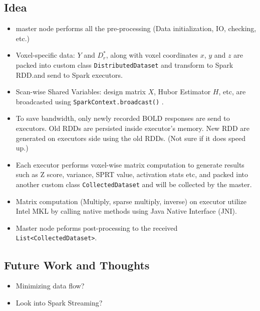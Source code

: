 \documentclass{article}
\def\code#1{\texttt{#1}}
\begin{document}
\subsection{Idea}
\begin{itemize}
	\item master node performs all the pre-processing (Data initialization, IO, checking, etc.)
	\item Voxel-specific data: $Y$ and $D_r^*$, along with voxel coordinates $x$, $y$ and $z$ are packed into custom class \code{DistributedDataset} and transform to Spark RDD.and send to Spark executors.
	\item Scan-wise Shared Variables: design matrix $X$, Hubor Estimator $H$, etc, are broadcasted using \code{SparkContext.broadcast()} .
	\item To save bandwidth, only newly recorded BOLD responses are send to executors. Old RDDs are persisted inside executor's memory. New RDD are generated on executors side using the old RDDs. (Not sure if it does speed up.)
	\item Each executor performs voxel-wise matrix computation to generate results such as Z score, variance, SPRT value, activation stats etc, and packed into another custom class \code{CollectedDataset} and will be collected by the master.
	\item Matrix computation (Multiply, sparse multiply, inverse) on executor utilize Intel MKL by calling native methods using Java Native Interface (JNI).
	\item Master node peforms post-processing to the received \code{List<CollectedDataset>}.
\end{itemize}

\subsection{Future Work and Thoughts}
\begin{itemize}
	\item Minimizing data flow?
	\item Look into Spark Streaming?
\end{itemize}
\end{document}
